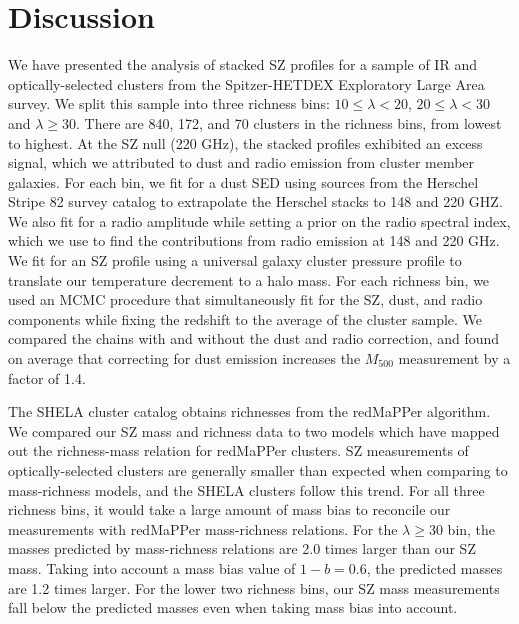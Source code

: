 \documentclass[a4paper,fleqn,usenatbib]{mnras}
\begin{document}

\section{Discussion} \label{sec:conclusions}
We have presented the analysis of stacked SZ profiles for a sample of IR and optically-selected clusters from the Spitzer-HETDEX Exploratory Large Area survey. 
We split this sample into three richness bins: $10 \leq \lambda < 20$, $20 \leq \lambda < 30$ and $\lambda \geq 30$. There are 840, 172, and 70 clusters in the richness bins, from lowest to highest. 
At the SZ null (220 GHz), the stacked profiles exhibited an excess signal, which we attributed to dust and radio emission from cluster member galaxies. 
For each bin, we fit for a dust SED using sources from the Herschel Stripe 82 survey catalog to extrapolate the Herschel stacks to 148 and 220 GHZ. 
We also fit for a radio amplitude while setting a prior on the radio spectral index, which we use to find the contributions from radio emission at 148 and 220 GHz. 
We fit for an SZ profile using a universal galaxy cluster pressure profile to translate our temperature decrement to a halo mass. 
For each richness bin, we used an MCMC procedure that simultaneously fit for the SZ, dust, and radio components while fixing the redshift to the average of the cluster sample.  
We compared the chains with and without the dust and radio correction, and found on average that correcting for dust emission increases the $M_{500}$ measurement by a factor of 1.4. 


The SHELA cluster catalog obtains richnesses from the redMaPPer algorithm. 
We compared our SZ mass and richness data to two models which have mapped out the richness-mass relation for redMaPPer clusters. 
SZ measurements of optically-selected clusters are generally smaller than expected when comparing to mass-richness models, and the SHELA clusters follow this trend. 
For all three richness bins, it would take a large amount of mass bias to reconcile our measurements with redMaPPer mass-richness relations. 
For the $\lambda \geq 30$ bin, the masses predicted by mass-richness relations are 2.0 times larger than our SZ mass.
Taking into account a mass bias value of $1-b = 0.6$, the predicted masses are 1.2 times larger.
For the lower two richness bins, our SZ mass measurements fall below the predicted masses even when taking mass bias into account.
\end{document}
